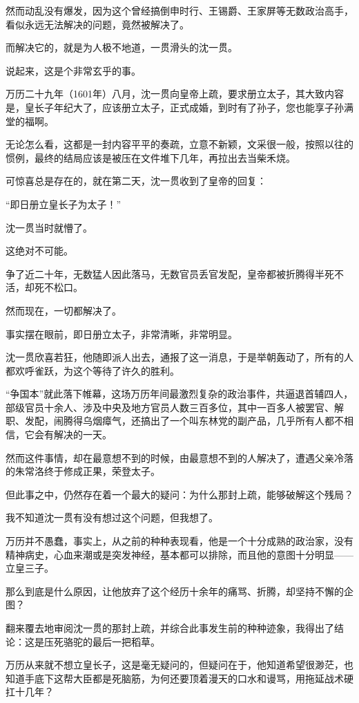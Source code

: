 \begin{multicols}{\theparacolNo}
然而动乱没有爆发，因为这个曾经搞倒申时行、王锡爵、王家屏等无数政治高手，看似永远无法解决的问题，竟然被解决了。

而解决它的，就是为人极不地道，一贯滑头的沈一贯。

说起来，这是个非常玄乎的事。

万历二十九年（1601年）八月，沈一贯向皇帝上疏，要求册立太子，其大致内容是，皇长子年纪大了，应该册立太子，正式成婚，到时有了孙子，您也能享子孙满堂的福啊。

无论怎么看，这都是一封内容平平的奏疏，立意不新颖，文采很一般，按照以往的惯例，最终的结局应该是被压在文件堆下几年，再拉出去当柴禾烧。

可惊喜总是存在的，就在第二天，沈一贯收到了皇帝的回复：

“即日册立皇长子为太子！”

沈一贯当时就懵了。

这绝对不可能。

争了近二十年，无数猛人因此落马，无数官员丢官发配，皇帝都被折腾得半死不活，却死不松口。

然而现在，一切都解决了。

事实摆在眼前，即日册立太子，非常清晰，非常明显。

沈一贯欣喜若狂，他随即派人出去，通报了这一消息，于是举朝轰动了，所有的人都欢呼雀跃，为这个等待了许久的胜利。

“争国本”就此落下帷幕，这场万历年间最激烈复杂的政治事件，共逼退首辅四人，部级官员十余人、涉及中央及地方官员人数三百多位，其中一百多人被罢官、解职、发配，闹腾得乌烟瘴气，还搞出了一个叫东林党的副产品，几乎所有人都不相信，它会有解决的一天。

然而这件事情，却在最意想不到的时候，由最意想不到的人解决了，遭遇父亲冷落的朱常洛终于修成正果，荣登太子。

但此事之中，仍然存在着一个最大的疑问：为什么那封上疏，能够破解这个残局？

我不知道沈一贯有没有想过这个问题，但我想了。

万历并不愚蠢，事实上，从之前的种种表现看，他是一个十分成熟的政治家，没有精神病史，心血来潮或是突发神经，基本都可以排除，而且他的意图十分明显——立皇三子。

那么到底是什么原因，让他放弃了这个经历十余年的痛骂、折腾，却坚持不懈的企图？

翻来覆去地审阅沈一贯的那封上疏，并综合此事发生前的种种迹象，我得出了结论：这是压死骆驼的最后一把稻草。

万历从来就不想立皇长子，这是毫无疑问的，但疑问在于，他知道希望很渺茫，也知道手底下这帮大臣都是死脑筋，为何还要顶着漫天的口水和谩骂，用拖延战术硬扛十几年？


\end{multicols}
